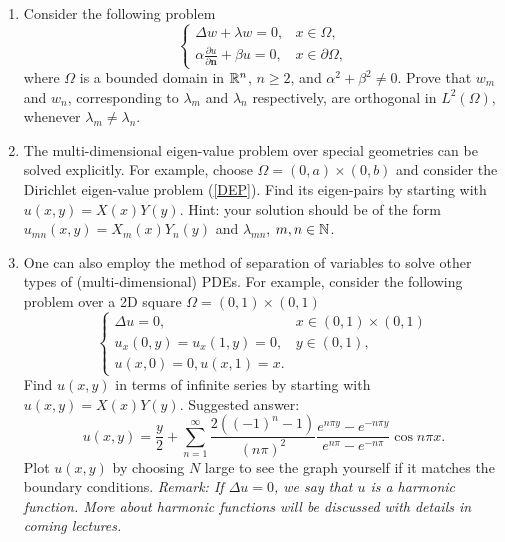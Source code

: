 \documentclass[6pt]{article}
\numberwithin{equation}{section}
\def\mathbb{\Bbb}
\begin{document}
\begin{enumerate}
\item Consider the following problem
\begin{equation}\label{ndep}
\left\{
\begin{array}{ll}
\Delta w+\lambda w=0,& x\in \Omega,\\
\alpha\frac{\partial u}{\partial \textbf{n}}+\beta u=0, &x\in\partial\Omega,
\end{array}
\right.
\end{equation}
where $\Omega$ is a bounded domain in $\mathbb R^n$, $n\geq2$, and $\alpha^2+\beta^2\neq0$.  Prove that $w_m$ and $w_n$, corresponding to $\lambda_m$ and $\lambda_n$ respectively, are orthogonal in $L^2(\Omega)$, whenever $\lambda_m\neq \lambda_n$.

\item The multi-dimensional eigen-value problem over special geometries can be solved explicitly.  For example, choose $\Omega=(0,a)\times(0,b)$ and consider the Dirichlet eigen-value problem (\ref{DEP}).  Find its eigen-pairs by starting with $u(x,y)=X(x)Y(y)$.  Hint: your solution should be of the form $u_{mn}(x,y)=X_m(x)Y_n(y)$ and $\lambda_{mn}$, $m,n\in\mathbb N$.

\item One can also employ the method of separation of variables to solve other types of (multi-dimensional) PDEs.  For example, consider the following problem over a 2D square $\Omega=(0,1)\times(0,1)$
\begin{equation}
\left\{
\begin{array}{ll}
\Delta u=0,& x\in(0,1)\times(0,1)\\
u_x(0,y)=u_x(1,y)=0,&y\in(0,1),\\
u(x,0)=0, u(x,1)=x. &
\end{array}
\right.
\end{equation}
Find $u(x,y)$ in terms of infinite series by starting with $u(x,y)=X(x)Y(y)$.  Suggested answer:
\[u(x,y)=\frac{y}{2}+\sum_{n=1}^\infty \frac{2((-1)^n-1)}{(n\pi)^2}\frac{e^{n\pi y}-e^{-n\pi y}}{e^{n\pi}-e^{-n\pi}}\cos n\pi x.\]
Plot $u(x,y)$ by choosing $N$ large to see the graph yourself if it matches the boundary conditions.  \emph{Remark: If $\Delta u=0$, we say that $u$ is a harmonic function.  More about harmonic functions will be discussed with details in coming lectures.}


\end{enumerate}
\end{document}
